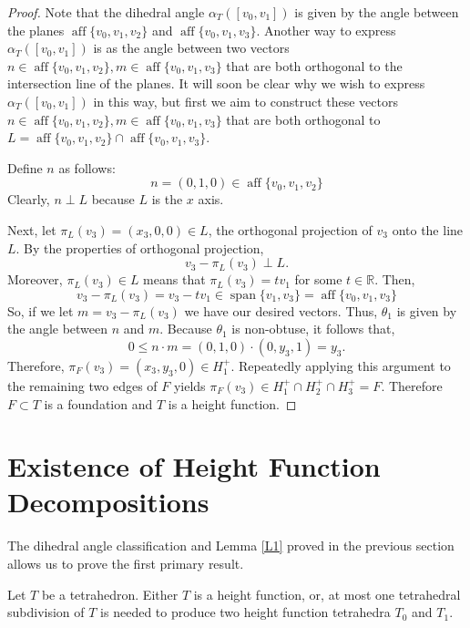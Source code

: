 \documentclass{mainresearch}
\begin{document}
\begin{proof}
	Note that the dihedral angle $\alpha_T([v_0,v_1])$ is given by the angle between the planes $\operatorname{aff}\{v_0,v_1,v_2\}$ and $\operatorname{aff}\{v_0,v_1,v_3\}$. Another way to express $\alpha_T([v_0,v_1])$ is as the angle between two vectors $n\in \operatorname{aff}\{v_0,v_1,v_2\}, m\in \operatorname{aff}\{v_0,v_1,v_3\}$ that are both orthogonal to the intersection line of the planes. It will soon be clear why we wish to express $\alpha_T([v_0,v_1])$ in this way, but first we aim to construct these vectors $n\in \operatorname{aff}\{v_0,v_1,v_2\}, m\in \operatorname{aff}\{v_0,v_1,v_3\}$ that are both orthogonal to $L=\operatorname{aff}\{v_0,v_1,v_2\} \cap \operatorname{aff}\{v_0,v_1,v_3\}$.
	
	Define $n$ as follows:
	\[
	n=(0,1,0)\in \operatorname{aff}\{v_0,v_1,v_2\}
	\]  
	Clearly, $n \perp L$ because $L$ is the $x$ axis.
	
	Next, let $\pi_L(v_3) = (x_3,0,0) \in L$, the orthogonal projection of $v_3$ onto the line $L$. By the properties of orthogonal projection,
	\begin{equation*}
		v_3-\pi_L(v_3) \perp L.
	\end{equation*}
	Moreover, $\pi_L(v_3)\in L$ means that $\pi_L(v_3) =tv_1$ for some $t\in \mathbb{R}$. Then, 
	\[
	v_3-\pi_L(v_3) = v_3-tv_1\in \operatorname{span}\{v_1,v_3\}=\operatorname{aff}\{v_0,v_1,v_3\}
	\]
	So, if we let $m= v_3-\pi_L(v_3)$ we have our desired vectors.
	Thus, $\theta_1$ is given by the angle between $n$ and $m$.
	Because $\theta_1$ is non-obtuse, it follows that,
	\begin{equation*}
		0\le n\cdot m = (0,1,0)\cdot(0,y_3,1) = y_3.
	\end{equation*}
	Therefore, $\pi_F(v_3) = (x_3,y_3,0) \in H_1^+$. Repeatedly applying this argument to the remaining     two edges of $F$ yields $\pi_F(v_3) \in H_1^+\cap H_2^+ \cap H_3^+ =F$. Therefore $F\subset T$ is a foundation and $T$ is a height function.
	
	
	
	
\end{proof}


\section{Existence of Height Function Decompositions}\label{BISEC}

The dihedral angle classification and Lemma \ref{L1} proved in the previous section allows us to prove the first primary result.
\begin{thm}\label{THM2}
	Let $T$ be a tetrahedron. Either $T$ is a height function, or, at most one tetrahedral subdivision of $T$ is needed to produce two height function tetrahedra $T_0$ and $T_1$.
\end{thm}
\end{document}
